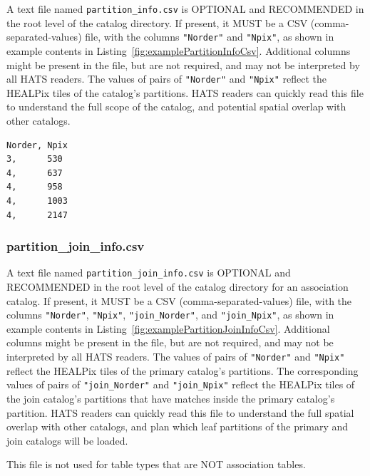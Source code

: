 \documentclass[11pt,a4paper]{ivoa}
\begin{document}
A text file named \texttt{partition\_info.csv} is OPTIONAL and RECOMMENDED in the root level of the catalog directory.
If present, it MUST be a CSV (comma-separated-values) file, with the columns \texttt{"Norder"} and \texttt{"Npix"}, as shown in example contents in Listing~\ref{fig:examplePartitionInfoCsv}.
Additional columns might be present in the file, but are not required, and may not be interpreted by all HATS readers.
The values of pairs of \texttt{"Norder"} and \texttt{"Npix"} reflect the HEALPix tiles of the catalog's partitions. 
HATS readers can quickly read this file to understand the full scope of the catalog, and potential spatial overlap with other catalogs.

\begin{minipage}{\linewidth}
\begin{lstlisting}[caption=Example \texttt{partition\_info.csv} file contents, label=fig:examplePartitionInfoCsv]    
Norder,	Npix
3,      530
4,      637
4,      958
4,      1003
4,      2147
\end{lstlisting}
\end{minipage}

\subsubsection{partition\_join\_info.csv} 

A text file named \texttt{partition\_join\_info.csv} is OPTIONAL and RECOMMENDED in the root level of the catalog directory for an association catalog.
If present, it MUST be a CSV (comma-separated-values) file, with the columns \texttt{"Norder"}, \texttt{"Npix"}, \texttt{"join\_Norder"}, and \texttt{"join\_Npix"}, as shown in example contents in Listing~\ref{fig:examplePartitionJoinInfoCsv}.
Additional columns might be present in the file, but are not required, and may not be interpreted by all HATS readers.
The values of pairs of \texttt{"Norder"} and \texttt{"Npix"} reflect the HEALPix tiles of the primary catalog's partitions. 
The corresponding values of pairs of \texttt{"join\_Norder"} and \texttt{"join\_Npix"} reflect the HEALPix tiles of the join catalog's partitions that have matches inside the primary catalog's partition.
HATS readers can quickly read this file to understand the full spatial overlap with other catalogs, and plan which leaf partitions of the primary and join catalogs will be loaded. \par

This file is not used for table types that are NOT association tables.
\end{document}
